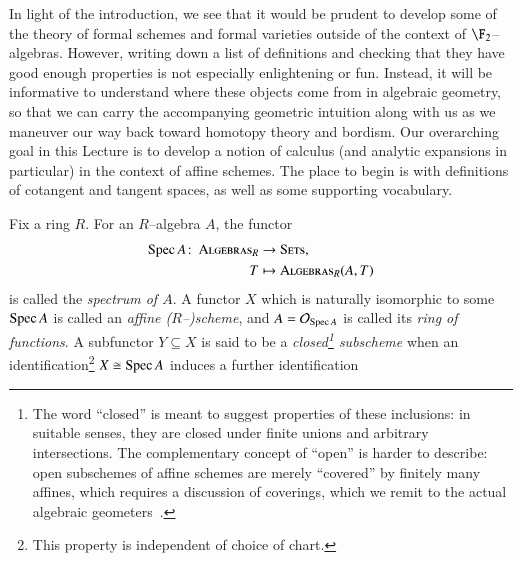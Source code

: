 In light of the introduction, we see that it would be prudent to develop some of the theory of formal schemes and formal varieties outside of the context of $\F_2$--algebras.  However, writing down a list of definitions and checking that they have good enough properties is not especially enlightening or fun.  Instead, it will be informative to understand where these objects come from in algebraic geometry, so that we can carry the accompanying geometric intuition along with us as we maneuver our way back toward homotopy theory and bordism.  Our overarching goal in this Lecture is to develop a notion of calculus (and analytic expansions in particular) in the context of affine schemes.  The place to begin is with definitions of cotangent and tangent spaces, as well as some supporting vocabulary.
\begin{definition}
Fix a ring $R$.  For an $R$--algebra $A$, the functor
\begin{align*}
\operatorname{Spec} A \colon\thinspace \normalfont\textsc{Algebras}_R & \to \normalfont\textsc{Sets}, \\
T & \mapsto \normalfont\textsc{Algebras}_R(A, T)
\end{align*}
is called the \textit{spectrum of $A$}.  A functor $X$ which is naturally isomorphic to some $\operatorname{Spec} A$ is called an \textit{affine ($R$--)scheme}, and $A = \mathcal{O}_{\operatorname{Spec} A}$ is called its \textit{ring of functions}.  A subfunctor $Y \subseteq X$ is said to be a \textit{closed\footnote{The word ``closed'' is meant to suggest properties of these inclusions: in suitable senses, they are closed under finite unions and arbitrary intersections.  The complementary concept of ``open'' is harder to describe: open subschemes of affine schemes are merely ``covered'' by finitely many affines, which requires a discussion of coverings, which we remit to the actual algebraic geometers~\cite[Definition 8.1]{StricklandFPFP}.} subscheme} when an identification\footnote{This property is independent of choice of chart.} $X \cong \operatorname{Spec} A$ induces a further identification
\begin{center}
\end{center}
\end{definition}

